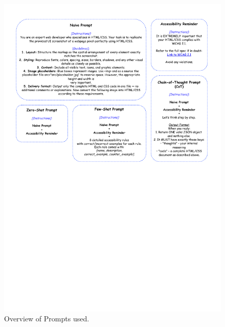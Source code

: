 \newpage







\begin{figure}[htbp]
  \centering
  \includegraphics[page=1,width=\linewidth,trim=0cm 14cm 0cm 0cm,clip,]{figures/prompts.pdf}
  \caption{Overview of Prompts used.}
  \label{fig:prompt-overview}
\end{figure}







\newpage









